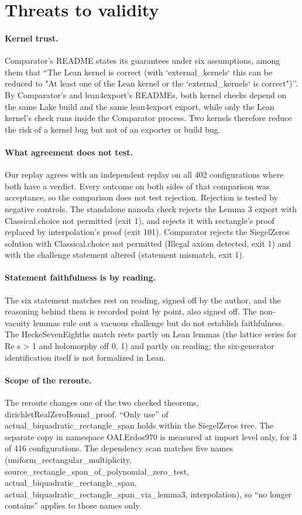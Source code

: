 \section{Threats to validity}\label{sec:threats}

\paragraph{Kernel trust.}
Comparator's README states its guarantees under six assumptions, among them that ``The Lean kernel is correct (with `external\_kernels` this can be reduced to "At least one of the Lean kernel or the `external\_kernels` is correct")''.
By Comparator's and lean4export's READMEs, both kernel checks depend on the same Lake build and the same lean4export export, while only the Lean kernel's check runs inside the Comparator process.
Two kernels therefore reduce the risk of a kernel bug but not of an exporter or build bug.

\paragraph{What agreement does not test.}
Our replay agrees with an independent replay on all 402 configurations where both have a verdict.
Every outcome on both sides of that comparison was acceptance, so the comparison does not test rejection.
Rejection is tested by negative controls.
The standalone nanoda check rejects the Lemma 3 export with Classical.choice not permitted (exit 1), and rejects it with rectangle's proof replaced by interpolation's proof (exit 101).
Comparator rejects the SiegelZeros solution with Classical.choice not permitted (Illegal axiom detected, exit 1) and with the challenge statement altered (statement mismatch, exit 1).

\paragraph{Statement faithfulness is by reading.}
The six statement matches rest on reading, signed off by the author, and the reasoning behind them is recorded point by point, also signed off.
The non-vacuity lemmas rule out a vacuous challenge but do not establish faithfulness.
The HeckeSevenEighths match rests partly on Lean lemmas (the lattice series for Re s > 1 and holomorphy off {0, 1}) and partly on reading; the six-generator identification itself is not formalized in Lean.

\paragraph{Scope of the reroute.}
The reroute changes one of the two checked theorems, dirichletRealZeroBound\_proof.
``Only use'' of actual\_biquadratic\_rectangle\_span holds within the SiegelZeros tree.
The separate copy in namespace OAI.Erdos970 is measured at import level only, for 3 of 416 configurations.
The dependency scan matches five names (uniform\_rectangular\_multiplicity, source\_rectangle\_span\_of\_polynomial\_zero\_test, actual\_biquadratic\_rectangle\_span, actual\_biquadratic\_rectangle\_span\_via\_lemma3, interpolation), so ``no longer contains'' applies to those names only.

